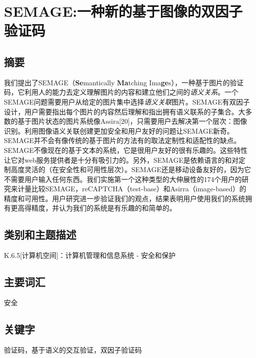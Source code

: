 \section{SEMAGE:一种新的基于图像的双因子验证码}\label{semageux4e00ux79cdux65b0ux7684ux57faux4e8eux56feux50cfux7684ux53ccux56e0ux5b50ux9a8cux8bc1ux7801}

\subsection{摘要}\label{ux6458ux8981}

我们提出了SEMAGE（\textbf{Se}mantically \textbf{Ma}tching
Ima\textbf{ge}s），一种基于图片的验证码，它利用人的能力去定义理解图片的内容和建立他们之间的\emph{语义关系}。一个SEMAGE问题需要用户从给定的图片集中选择\emph{语义关联}图片。SEMAGE有双因子设计，用户需要指出每个图片的内容然后理解和指出拥有语义联系的子集合。大多数的基于图片状态的图片系统像Assira{[}20{]}，只需要用户去解决第一个层次：图像识别。利用图像语义关联创建更加安全和用户友好的问题让SEMAGE新奇。SEMAGE并不会有像传统的基于图片的方法有的取法定制性和适配性的缺点。SEMAGE不像现在的基于文本的系统，它是很用户友好的很有乐趣的。这些特性让它对web服务提供者是十分有吸引力的。另外，SEMAGE是依赖语言的和对定制高度灵活的（在安全性和可用性层次）。SEMAGE还是移动设备友好的，因为它不需要用户输入任何东西。我们实施第一个这种类型的大伸展性的174个用户的研究来计量比较SEMAGE，reCAPTCHA（test-base）和Asirra（image-based）的精度和可用性。用户研究进一步验证我们的观点，结果表明用户使用我们的系统拥有更高得精度，并认为我们的系统是有乐趣的和简单的。

\subsection{类别和主题描述}\label{ux7c7bux522bux548cux4e3bux9898ux63cfux8ff0}

K.6.5{[}计算机空间{]}：计算机管理和信息系统 - 安全和保护

\subsection{主要词汇}\label{ux4e3bux8981ux8bcdux6c47}

安全

\subsection{关键字}\label{ux5173ux952eux5b57}

验证码，基于语义的交互验证，双因子验证码

